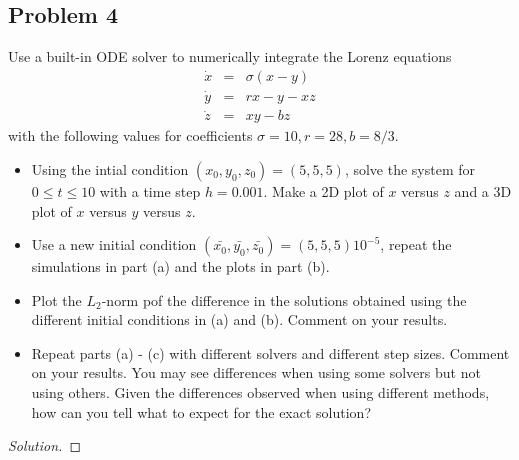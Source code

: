 \documentclass[12pt]{amsart}
\newenvironment{solution}
{\begin{proof}[Solution]}
{\end{proof}}
\begin{document}
\begin{onehalfspace}
        \section{Problem 4}
        Use a built-in ODE solver to numerically integrate the Lorenz equations
        \begin{eqnarray*}
            \dot{x} & = & \sigma(x - y)\\
            \dot{y} & = & rx - y - xz \\
            \dot{z} & = & xy - bz
        \end{eqnarray*}
        with the following values for coefficients $\sigma=10, r = 28, b = 8/3$.
        \begin{itemize}
            \item[(a)] Using the intial condition $(x_0, y_0, z_0) = (5, 5, 5)$, solve the system for
            $0\le t\le 10$ with a time step $h=0.001$. Make a 2D plot of $x$ versus $z$ and a 3D plot
            of $x$ versus $y$ versus $z$.
            \item[(b)] Use a new initial condition $(\bar{x_0}, \bar{y_0}, \bar{z_0}) = (5,5,5) 10^{-5}$,
            repeat the simulations in part (a) and the plots in part (b).
            \item[(c)] Plot the $L_2$-norm pof the difference in the solutions obtained using the
            different initial conditions in (a) and (b).
            Comment on your results.
            \item[(d)] Repeat parts (a) - (c) with different solvers and different step sizes.
            Comment on your results.
            You may see differences when using some solvers but not using others.
            Given the differences observed when using different methods, how can you tell what to expect
            for the exact solution?
        \end{itemize}

        \begin{solution}


\end{solution}
\end{onehalfspace}
\end{document}
